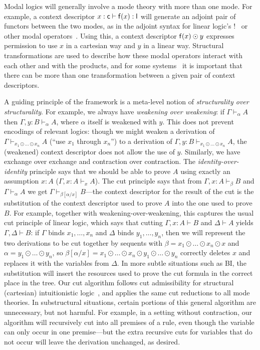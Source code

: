 \documentclass[a4paper,USenglish,numberwithinsect]{lipics-v2016}
\newcommand\seq[3]{\ensuremath{#1 \vdash_{#2} #3}}
\renewcommand\subst[3]{\ensuremath{#1[#2/#3]}}
\begin{document}
Modal logics will generally involve a mode theory with more than one
mode.  For example, a context descriptor $x : \mathsf{c} \vdash \mathsf{f}(x)
: \mathsf{l}$ will generate an adjoint pair of functors between the two
modes, as in the adjoint syntax for linear logic's
$!$~\cite{bentonwadler96adjoint} or other modal
operators~\cite{reed09adjoint}.  Using this, a context descriptor
$\mathsf{f}(x) \odot y$ expresses permission to use $x$ in a cartesian way
and $y$ in a linear way.  Structural transformations are used to
describe how these modal operators interact with each other and with the
products, and for some systems~\cite{ls16adjoint} it is important that
there can be more than one transformation between a given pair of
context descriptors.

A guiding principle of the framework is a meta-level notion of
\emph{structurality over structurality}.  For example, we always have
\emph{weakening over weakening}: if \seq{\Gamma}{\alpha}{A} then
\seq{\Gamma,y:B}{\alpha}{A}, where $\alpha$ itself is weakened with $y$.
This does not prevent encodings of relevant logics: though we might
weaken a derivation of \seq{\Gamma}{x_1 \odot \ldots \odot x_n}{A}
(``use $x_1$ through $x_n$'') to a derivation of \seq{\Gamma,y:B}{x_1
  \odot \ldots \odot x_n}{A}, the (weakened) context descriptor does not
allow the use of $y$.  Similarly, we have exchange over exchange and
contraction over contraction.  The \emph{identity-over-identity}
principle says that we should be able to prove $A$ using exactly an
assumption $x:A$ ({\seq{\Gamma,x:A}{x}{A}}).  The cut principle says
that from \seq{\Gamma,x:A}{\beta}{B} and \seq{\Gamma}{\alpha}{A} we get
{\seq{\Gamma}{\subst{\beta}{\alpha}{x}}{B}}---the context descriptor for
the result of the cut is the substitution of the context descriptor used
to prove $A$ into the one used to prove $B$.  For example, together with
weakening-over-weakening, this captures the usual cut principle of
linear logic, which says that cutting $\Gamma,x:A \vdash B$ and $\Delta
\vdash A$ yields $\Gamma,\Delta \vdash B$: if $\Gamma$ binds
$x_1,\ldots,x_n$ and $\Delta$ binds $y_1,\ldots,y_n$, then we will
represent the two derivations to be cut together by sequents with $\beta
= x_1 \odot \ldots \odot x_n \odot x$ and $\alpha = y_1 \odot \ldots
\odot y_n$, so $\beta[\alpha/x] = x_1 \odot \ldots \odot x_n \odot y_1
\odot \ldots \odot y_n$ correctly deletes $x$ and replaces it with the
variables from $\Delta$.  In more subtle situations such as BI, the
substitution will insert the resources used to prove the cut formula in
the correct place in the tree.  Our cut algorithm follows cut
admissibility for structural (cartesian) intuitionistic
logic~\cite{pfenning94cut}, and applies the same cut reductions to all
mode theories.  In substructural situations, certain portions of this
general algorithm are unnecessary, but not harmful.  For example, in a
setting without contraction, our algorithm will recursively cut into all
premises of a rule, even though the variable can only occur in one
premise---but the extra recursive cuts for variables that do not occur
will leave the derivation unchanged, as desired.
\end{document}
